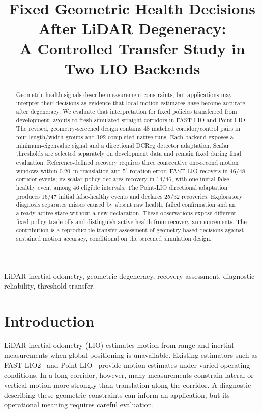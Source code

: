 \documentclass[conference]{IEEEtran}
\title{Fixed Geometric Health Decisions After LiDAR Degeneracy:\\
A Controlled Transfer Study in Two LIO Backends}
\author{\IEEEauthorblockN{Harshil Patel, Daksha Lingampeta, and Nisarg Vyas}}
\begin{document}
\maketitle
\begin{abstract}
Geometric health signals describe measurement constraints, but applications
may interpret their decisions as evidence that local motion estimates have
become accurate after degeneracy. We evaluate that interpretation for fixed
policies transferred from development layouts to fresh simulated straight
corridors in FAST-LIO and Point-LIO. The revised, geometry-screened design
contains 48 matched corridor/control pairs in four length/width groups and
192 completed native runs. Each backend exposes a minimum-eigenvalue signal
and a directional DCReg detector adaptation. Scalar thresholds are selected
separately on development data and remain fixed during final evaluation.
Reference-defined recovery requires three consecutive one-second motion
windows within 0.20~m translation and $5^\circ$ rotation error. FAST-LIO
recovers in 46/48 corridor events; its scalar policy declares recovery in
14/46, with one initial false-healthy event among 46 eligible intervals.
The Point-LIO directional adaptation produces 16/47 initial false-healthy
events and declares 25/32 recoveries. Exploratory diagnosis separates misses
caused by absent raw health, failed confirmation and an already-active state
without a new declaration. These observations expose different fixed-policy
trade-offs and distinguish active health from recovery announcements. The
contribution is a reproducible transfer assessment of geometry-based decisions
against sustained motion accuracy, conditional on the screened simulation design.
\end{abstract}
\begin{IEEEkeywords}
LiDAR-inertial odometry, geometric degeneracy, recovery assessment,
diagnostic reliability, threshold transfer.
\end{IEEEkeywords}

\section{Introduction}
LiDAR-inertial odometry (LIO) estimates motion from range and inertial
measurements when global positioning is unavailable. Existing estimators
such as FAST-LIO2~\cite{fastlio} and Point-LIO~\cite{pointlio} provide motion
estimates under varied operating conditions. In a long corridor, however,
many measurements constrain lateral or vertical motion more strongly than
translation along the corridor. A diagnostic describing these geometric
constraints can inform an application, but its operational meaning requires
careful evaluation.
\end{document}
